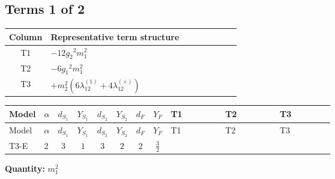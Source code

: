 \documentclass[8pt]{article}
\begin{document}
\begin{landscape}
\subsection*{Terms 1 of 2}
\begin{center}
\begin{tabular}{@{}c >{\raggedright\arraybackslash}p{0.82\linewidth}@{}}
\toprule
Column & Representative term structure \\
\midrule
T1 & \(\displaystyle -12 {g_2}^2 {m_1^2}\) \\
\midrule
T2 & \(\displaystyle -6 {g_1}^2 {m_1^2}\) \\
\midrule
T3 & \(\displaystyle +{m_2^2} (6 {\lambda_{12}^{(1)}}+4 {\lambda_{12}^{(\times)}})\) \\
\midrule
\bottomrule
\end{tabular}
\end{center}
\smallskip
\tiny
\begin{longtable}{@{}llcccccc >{\raggedright\arraybackslash}p{0.21\linewidth} >{\raggedright\arraybackslash}p{0.21\linewidth} >{\raggedright\arraybackslash}p{0.21\linewidth}@{}}
\toprule
Model & $\alpha$ & $d_{S_1}$ & $Y_{S_1}$ & $d_{S_2}$ & $Y_{S_2}$ & $d_F$ & $Y_F$ & T1 & T2 & T3 \\
\midrule
\endfirsthead
\toprule
Model & $\alpha$ & $d_{S_1}$ & $Y_{S_1}$ & $d_{S_2}$ & $Y_{S_2}$ & $d_F$ & $Y_F$ & T1 & T2 & T3 \\
\midrule
\endhead
T3-E & $2$ & $3$ & $1$ & $3$ & $2$ & $2$ & $\frac{3}{2}$ & \scriptsize\adjustbox{max width=\linewidth}{$\begin{gathered} -12 {g_2}^2 {m_1^2}\end{gathered}$} & \scriptsize\adjustbox{max width=\linewidth}{$\begin{gathered} -6 {g_1}^2 {m_1^2}\end{gathered}$} & \scriptsize\adjustbox{max width=\linewidth}{$\begin{gathered} +{m_2^2} (6 {\lambda_{12}^{(1)}}+4 {\lambda_{12}^{(\times)}})\end{gathered}$} \\
\midrule
\bottomrule
\end{longtable}
\clearpage
\noindent\textbf{Quantity: }$m_1^2$\par\smallskip

\end{landscape}
\end{document}
